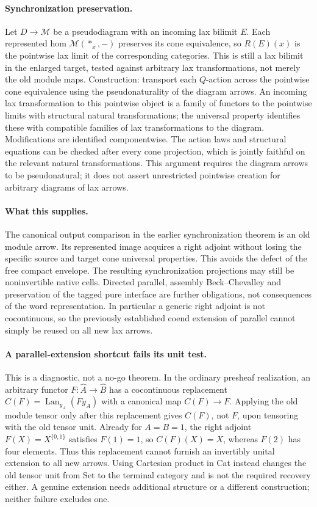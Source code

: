 \documentclass{article}
\begin{document}
\paragraph{Synchronization preservation.} Let $D\to\mathcal M$ be a pseudodiagram with an incoming lax bilimit $E$. Each represented hom $\mathcal M(*_x,-)$ preserves its cone equivalence, so $R(E)(x)$ is the pointwise lax limit of the corresponding categories. This is still a lax bilimit in the enlarged target, tested against arbitrary lax transformations, not merely the old module maps. Construction: transport each $Q$-action across the pointwise cone equivalence using the pseudonaturality of the diagram arrows. An incoming lax transformation to this pointwise object is a family of functors to the pointwise limits with structural natural transformations; the universal property identifies these with compatible families of lax transformations to the diagram. Modifications are identified componentwise. The action laws and structural equations can be checked after every cone projection, which is jointly faithful on the relevant natural transformations. This argument requires the diagram arrows to be pseudonatural; it does not assert unrestricted pointwise creation for arbitrary diagrams of lax arrows.

\paragraph{What this supplies.} The canonical output comparison in the earlier synchronization theorem is an old module arrow. Its represented image acquires a right adjoint without losing the specific source and target cone universal properties. This avoids the defect of the free compact envelope. The resulting synchronization projections may still be noninvertible native cells. Directed parallel, assembly Beck--Chevalley and preservation of the tagged pure interface are further obligations, not consequences of the word representation. In particular a generic right adjoint is not cocontinuous, so the previously established coend extension of parallel cannot simply be reused on all new lax arrows.

\paragraph{A parallel-extension shortcut fails its unit test.} This is a diagnostic, not a no-go theorem. In the ordinary presheaf realization, an arbitrary functor $F:\widehat A\to\widehat B$ has a cocontinuous replacement $C(F)=\operatorname{Lan}_{y_A}(F y_A)$ with a canonical map $C(F)\to F$. Applying the old module tensor only after this replacement gives $C(F)$, not $F$, upon tensoring with the old tensor unit. Already for $A=B=1$, the right adjoint $F(X)=X^{\{0,1\}}$ satisfies $F(1)=1$, so $C(F)(X)=X$, whereas $F(2)$ has four elements. Thus this replacement cannot furnish an invertibly unital extension to all new arrows. Using Cartesian product in Cat instead changes the old tensor unit from Set to the terminal category and is not the required recovery either. A genuine extension needs additional structure or a different construction; neither failure excludes one.
\end{document}
